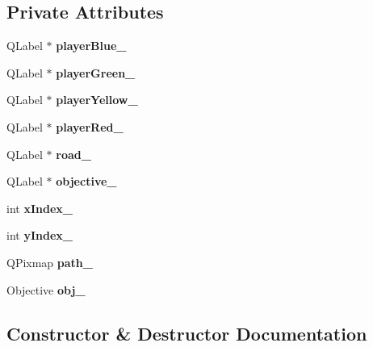 \subsection*{Private Attributes}
\begin{DoxyCompactItemize}
\item 
\mbox{\label{class_box_a90b4fad8f565e9c815fdba9274cd5fff}} 
Q\+Label $\ast$ {\bfseries player\+Blue\+\_\+}
\item 
\mbox{\label{class_box_a41815b5067adf857cf270318df314e6f}} 
Q\+Label $\ast$ {\bfseries player\+Green\+\_\+}
\item 
\mbox{\label{class_box_a62b2835ffaacb5ecf0a417fff4228788}} 
Q\+Label $\ast$ {\bfseries player\+Yellow\+\_\+}
\item 
\mbox{\label{class_box_a05c0429077d172c1a536f5d5eda386db}} 
Q\+Label $\ast$ {\bfseries player\+Red\+\_\+}
\item 
\mbox{\label{class_box_a380393a9597e2d65fc39b88668acd90f}} 
Q\+Label $\ast$ {\bfseries road\+\_\+}
\item 
\mbox{\label{class_box_a6ff5ee94ced031d1e7da63941408d973}} 
Q\+Label $\ast$ {\bfseries objective\+\_\+}
\item 
\mbox{\label{class_box_a465d3d1be7534ded22e413416c0d8699}} 
int {\bfseries x\+Index\+\_\+}
\item 
\mbox{\label{class_box_a8da9f43ba66769a8904b5019b334c1a3}} 
int {\bfseries y\+Index\+\_\+}
\item 
\mbox{\label{class_box_ac1b9d3c7d4a9b463ce0203b417065af7}} 
Q\+Pixmap {\bfseries path\+\_\+}
\item 
\mbox{\label{class_box_a3e3d7153ba1eeda72f7584df44e381e9}} 
Objective {\bfseries obj\+\_\+}
\end{DoxyCompactItemize}


\subsection{Constructor \& Destructor Documentation}
\mbox{\label{class_box_ab32e4641d7318dcb3d50779a8089f52e}} 
